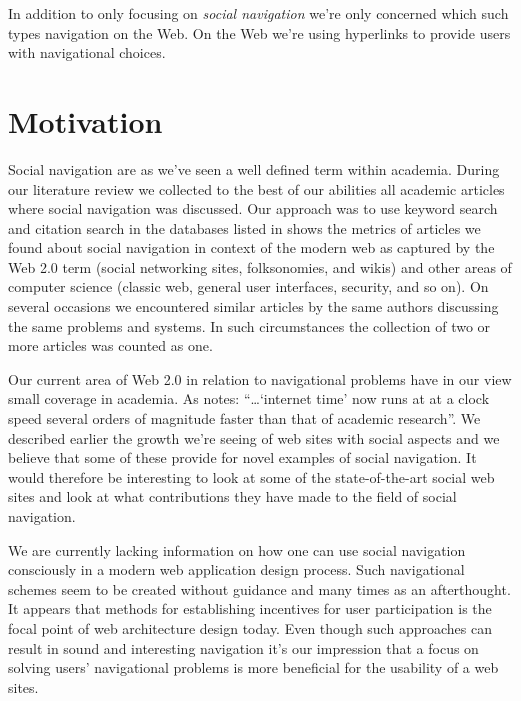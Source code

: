 In addition to only focusing on \emph{social navigation} we're only concerned
which such types navigation on the Web.
On the Web we're using hyperlinks \citep[p.~90]{nelson65} to provide users
with navigational choices.

\section{Motivation}

Social navigation are as we've seen a well defined term within academia.
During our literature review we collected to the best of our abilities all
academic articles where social navigation was discussed. Our approach was to
use keyword search and citation search in the databases listed in
shows the metrics of articles
we found about social navigation in context of the modern web as captured by
the Web 2.0 term (social networking sites, folksonomies, and wikis) and other
areas of computer science (classic web, general user interfaces, security, and
so on).
On several occasions we encountered similar articles by the same authors
discussing the same problems and systems. In such circumstances the collection
of two or more articles was counted as one.


Our current area of Web 2.0 in relation to navigational problems have in our
view small coverage in academia.
As \citet{beer07} notes: ``\ldots `internet time' now runs at at a clock speed
several orders of magnitude faster than that of academic research''.
We described earlier the growth we're seeing of web sites with social
aspects and we believe that some of these provide for novel examples of social
navigation. It would therefore be interesting to look at some of the
state-of-the-art social web sites and look at what contributions they have
made to the field of social navigation.

We are currently lacking information on how one can use social navigation
consciously in a modern web application design process. Such navigational
schemes seem to be created without guidance and many times as an afterthought.
It appears that methods for establishing incentives for user participation
is the focal point of web architecture design today. Even though such
approaches can result in sound and interesting navigation it's our impression
that a focus on solving users' navigational problems is more beneficial for
the usability of a web sites.

